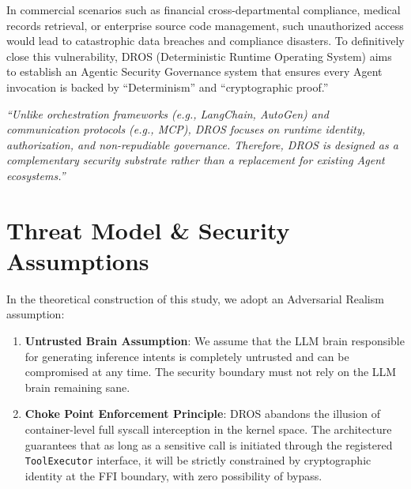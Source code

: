 \documentclass[conference]{IEEEtran}
\begin{document}
In commercial scenarios such as financial cross-departmental compliance, medical records retrieval, or enterprise source code management, such unauthorized access would lead to catastrophic data breaches and compliance disasters. To definitively close this vulnerability, DROS (Deterministic Runtime Operating System) aims to establish an Agentic Security Governance system that ensures every Agent invocation is backed by ``Determinism'' and ``cryptographic proof.''

\emph{``Unlike orchestration frameworks (e.g., LangChain, AutoGen) and communication protocols (e.g., MCP), DROS focuses on runtime identity, authorization, and non-repudiable governance. Therefore, DROS is designed as a complementary security substrate rather than a replacement for existing Agent ecosystems.''}

\section{Threat Model \& Security Assumptions}
In the theoretical construction of this study, we adopt an Adversarial Realism assumption:
\begin{enumerate}
\item \textbf{Untrusted Brain Assumption}: We assume that the LLM brain responsible for generating inference intents is completely untrusted and can be compromised at any time. The security boundary must not rely on the LLM brain remaining sane.
\item \textbf{Choke Point Enforcement Principle}: DROS abandons the illusion of container-level full syscall interception in the kernel space. The architecture guarantees that as long as a sensitive call is initiated through the registered \texttt{ToolExecutor} interface, it will be strictly constrained by cryptographic identity at the FFI boundary, with zero possibility of bypass.
\end{enumerate}
\end{document}
